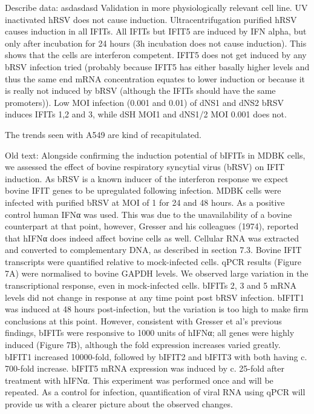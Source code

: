 Describe data: \newline
asdasdasd \newline
Validation in more physiologically relevant cell line. UV inactivated hRSV does not cause induction. Ultracentrifugation purified hRSV causes induction in all IFITs. All IFITs but IFIT5 are induced by IFN alpha, but only after incubation for 24 hours (3h incubation does not cause induction). This shows that the cells are interferon competent. IFIT5 does not get induced by any bRSV infection tried (probably because IFIT5 has either basally higher levels and thus the same end mRNA concentration equates to lower induction or because it is really not induced by bRSV (although the IFITs should have the same promoters)). Low MOI infection (0.001 and 0.01) of dNS1 and dNS2 bRSV induces IFITs 1,2 and 3, while dSH MOI1 and dNS1/2 MOI 0.001 does not. 

The trends seen with A549 are kind of recapitulated.


Old text:
Alongside confirming the induction potential of bIFITs in MDBK cells, we assessed the effect of bovine respiratory syncytial virus (bRSV) on IFIT induction. As bRSV is a known inducer of the interferon response we expect bovine IFIT genes to be upregulated following infection. MDBK cells were infected with purified bRSV at MOI of 1 for 24 and 48 hours. As a positive control human IFNα was used. This was due to the unavailability of a bovine counterpart at that point, however, Gresser and his colleagues (1974), reported that hIFNα does indeed affect bovine cells as well. Cellular RNA was extracted and converted to complementary DNA, as described in section 7.3. Bovine IFIT transcripts were quantified relative to mock-infected cells. qPCR results (Figure 7A) were normalised to bovine GAPDH levels. We observed large variation in the transcriptional response, even in mock-infected cells. bIFITs 2, 3 and 5 mRNA levels did not change in response at any time point post bRSV infection. bIFIT1 was induced at 48 hours post-infection, but the variation is too high to make firm conclusions at this point. However, consistent with Gresser et al’s previous findings, bIFITs were responsive to 1000 units of hIFNα; all genes were highly induced (Figure 7B), although the fold expression increases varied greatly. bIFIT1 increased 10000-fold, followed by bIFIT2 and bIFIT3 with both having c. 700-fold increase. bIFIT5 mRNA expression was induced by c. 25-fold after treatment with hIFNα. This experiment was performed once and will be repeated. As a control for infection, quantification of viral RNA using qPCR will provide us with a clearer picture about the observed changes.

